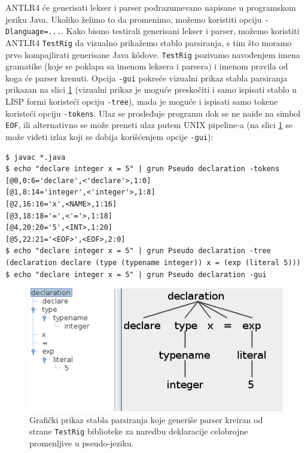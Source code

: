 ANTLR4 će generisati lekser i parser podrazumevano napisane u programskom jeziku Java. Ukoliko želimo to da promenimo, možemo koristiti opciju \texttt{-Dlanguage=...}. Kako bismo testirali generisani lekser i parser, možemo koristiti ANTLR4 \texttt{TestRig} da vizualno prikažemo stablo parsiranja, s tim što moramo prvo kompajlirati generisane Java k\^odove. \texttt{TestRig} pozivamo navođenjem imena gramatike (koje se poklapa sa imenom leksera i parsera) i imenom pravila od koga će parser krenuti. Opcija \texttt{-gui} pokreće vizualni prikaz stabla parsiranja prikazan na slici \ref{fig:PseudoTreeGui} (vizualni prikaz je moguće preskočiti i samo ispisati stablo u LISP formi koristeći opciju \texttt{-tree}), mada je moguće i ispisati samo tokene koristeći opciju \texttt{-tokens}. Ulaz se prosleđuje programu dok se ne naiđe na simbol \texttt{EOF}, ili alternativno se može preneti ulaz putem UNIX pipeline-a (na slici \ref{fig:PseudoTreeGui} se može videti izlaz koji se dobija korišćenjem opcije \texttt{-gui}):
\begin{lstlisting}[language={}]
$ javac *.java
$ echo "declare integer x = 5" | grun Pseudo declaration -tokens
[@0,0:6='declare',<'declare'>,1:0]
[@1,8:14='integer',<'integer'>,1:8]
[@2,16:16='x',<NAME>,1:16]
[@3,18:18='=',<'='>,1:18]
[@4,20:20='5',<INT>,1:20]
[@5,22:21='<EOF>',<EOF>,2:0]
$ echo "declare integer x = 5" | grun Pseudo declaration -tree
(declaration declare (type (typename integer)) x = (exp (literal 5)))
$ echo "declare integer x = 5" | grun Pseudo declaration -gui
\end{lstlisting}    

\begin{figure}[h!]
\centering
\includegraphics[scale=0.8]{images/pseudo_parse_tree.png}
\caption{Grafički prikaz stabla parsiranja koje generiše parser kreiran od strane \texttt{TestRig} biblioteke za naredbu deklaracije celobrojne promenljive u pseudo-jeziku.}
\label{fig:PseudoTreeGui}
\end{figure}


